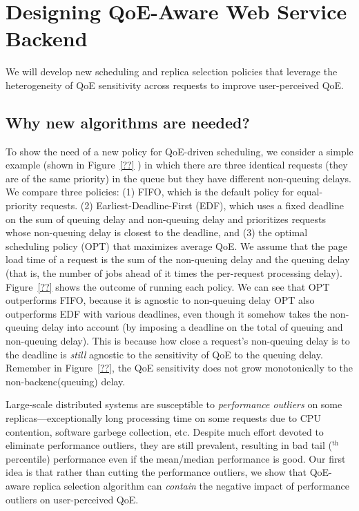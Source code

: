 \section{Designing QoE-Aware Web Service Backend}
\label{sec:design}

\begin{task}
We will develop new scheduling and replica selection policies that leverage the heterogeneity of QoE sensitivity across requests to improve user-perceived QoE.
\end{task}

\subsection{Why new algorithms are needed?}

To show the need of a new policy for QoE-driven  scheduling, we consider a simple example (shown in Figure~\ref{??} ) in which there are three identical requests (\ie they are of the same priority) in the queue but they have different non-queuing delays.
We compare three policies: 
(1) FIFO, which is the default policy for equal-priority requests.
(2) Earliest-Deadline-First (EDF), which uses a fixed deadline on the sum of queuing delay and non-queuing delay and prioritizes requests whose non-queuing delay is closest to the deadline, and 
(3) the optimal scheduling policy (OPT) that maximizes average QoE.
We assume that the page load time of a request is the sum of the non-queuing delay and the queuing delay (that is, the number of jobs ahead of it times the per-request processing delay).
Figure~\ref{??}  shows the outcome of running each policy. 
We can see that OPT outperforms FIFO, because it is agnostic to non-queuing delay
OPT also outperforms EDF with various deadlines, even though it somehow takes the non-queuing delay into account (by imposing a deadline on the total of queuing and non-queuing delay).
This is because how close a request's non-queuing delay is to the deadline is {\em still} agnostic to the sensitivity of QoE to the queuing delay. 
Remember in Figure~\ref{??}, the QoE sensitivity does not grow monotonically to the non-backenc(queuing) delay. 

Large-scale distributed systems are susceptible to {\em performance outliers} on some replicas---\eg exceptionally long processing time on some requests due to CPU contention, software garbege collection, etc. 
Despite much effort devoted to eliminate performance outliers, they are still prevalent, resulting in bad tail ($^\textrm{th}$ percentile) performance even if the mean/median performance is good.
Our first idea is that rather than cutting the performance outliers, we show that QoE-aware replica selection algorithm can {\em contain} the negative impact of performance outliers on user-perceived QoE.

